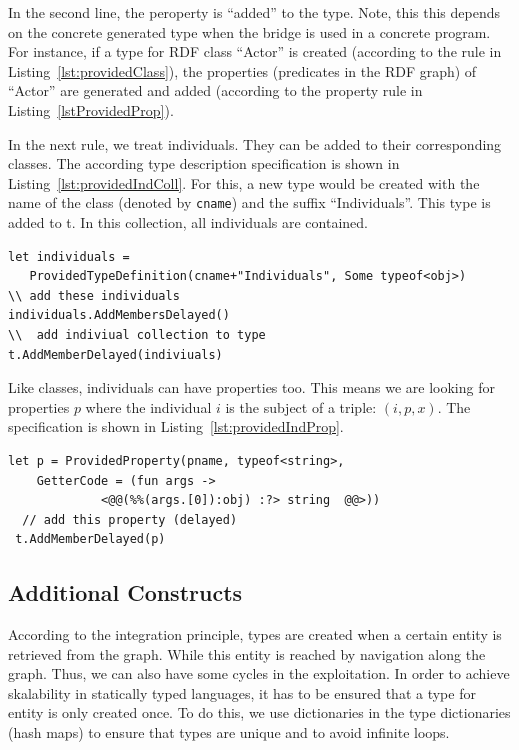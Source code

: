 \documentclass{llncs} %
\begin{document}
In the second line, the peroperty is ``added'' to the type. Note, this this depends on the concrete generated type 
when the bridge is used in a concrete program. For instance, if a type for RDF class ``Actor'' is created (according to the rule in Listing~\ref{lst:providedClass}),
the properties (predicates in the RDF graph) of ``Actor'' are generated and added (according to the property rule in Listing~\ref{lstProvidedProp}).

In the next rule, we treat individuals. They can be added to their corresponding classes.
The according type description specification is shown in Listing~\ref{lst:providedIndColl}.
For this, a new type would be created with the name of the class (denoted by \texttt{cname}) and the
suffix ``Individuals''. This type is added to t. In this collection, all individuals are contained.

\begin{lstlisting}[style=code, caption={\texttt{Individual Rule:} Add Individuals (set / collection) to Class C}, label={lst:providedIndColl}]
let individuals = 
   ProvidedTypeDefinition(cname+"Individuals", Some typeof<obj>)
\\ add these individuals
individuals.AddMembersDelayed()
\\  add indiviual collection to type 
t.AddMemberDelayed(indiviuals)
 \end{lstlisting}

Like classes, individuals can have properties too. This means we are looking for properties $p$ where
the individual $i$ is the subject of a triple: $(i, p, x)$. The specification is shown in Listing~\ref{lst:providedIndProp}.

\begin{lstlisting}[style=code, caption={\texttt{Individual Property Rule:} Add Property for individual ind}, label={lst:providedIndProp}]
 let p = ProvidedProperty(pname, typeof<string>, 
    GetterCode = (fun args -> 
		     <@@(%%(args.[0]):obj) :?> string  @@>))
  // add this property (delayed)
 t.AddMemberDelayed(p)
 \end{lstlisting}


\subsection{Additional Constructs}

According to the integration principle, types are created when a certain entity is retrieved from the graph. While this entity is reached
by navigation along the graph. Thus, we can also have some cycles in the exploitation. In order to achieve skalability in
statically typed languages, it has to be ensured that a type for entity is only created once.
To do this, we use dictionaries in the type dictionaries (hash maps) to ensure that types are unique and to avoid infinite loops.
\end{document}

